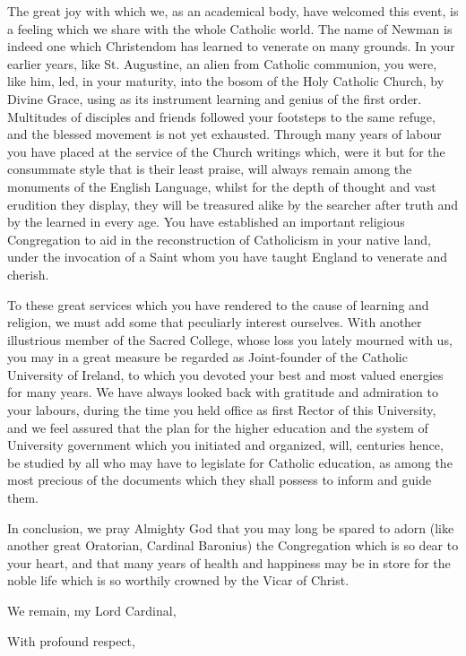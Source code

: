 The great joy with which we, as an academical body, have welcomed
this event, is a feeling which we share with the whole Catholic world.
The name of Newman is indeed one which Christendom has learned to
venerate on many grounds. In your earlier years, like St. Augustine,
an alien from Catholic communion, you were, like him, led, in your
maturity, into the bosom of the Holy Catholic Church, by Divine Grace,
using as its instrument learning and genius of the first order.
Multitudes of disciples and friends followed your footsteps to the
same refuge, and the blessed movement is not yet exhausted. Through
many years of labour you have placed at the service of the Church
writings which, were it but for the consummate style that is their
least praise, will always remain among the monuments of the English
Language, whilst for the depth of thought and vast erudition they
display, they will be treasured alike by the searcher after truth and by the learned in every age. You have established an
important religious Congregation to aid in the reconstruction of
Catholicism in your native land, under the invocation of a Saint whom
you have taught England to venerate and cherish.

To these great services which you have rendered to the cause of
learning and religion, we must add some that peculiarly interest
ourselves. With another illustrious member of the Sacred College,
whose loss you lately mourned with us, you may in a great measure be
regarded as Joint-founder of the Catholic University of Ireland, to
which you devoted your best and most valued energies for many years.
We have always looked back with gratitude and admiration to your
labours, during the time you held office as first Rector of this
University, and we feel assured that the plan for the higher education
and the system of University government which you initiated and
organized, will, centuries hence, be studied by all who may have to
legislate for Catholic education, as among the most precious of the
documents which they shall possess to inform and guide them.

In conclusion, we pray Almighty God that you may long be spared to
adorn (like another great Oratorian, Cardinal Baronius) the
Congregation which is so dear to your heart, and that many years of
health and happiness may be in store for the noble life which is
so worthily crowned by the Vicar of Christ.

We remain, my Lord Cardinal,

With profound respect,

